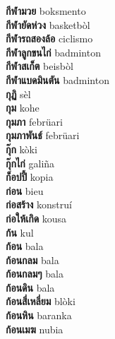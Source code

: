\textbf{ กีฬามวย  } boksmento \\
\textbf{ กีฬายัดห่วง  } basketbòl \\
\textbf{ กีฬารถสองล้อ  } ciclismo \\
\textbf{ กีฬาลูกขนไก่  } badminton \\
\textbf{ กีฬาสเก็ต  } beisbòl \\
\textbf{ กีฬาแบดมินตัน  } badminton \\
\textbf{ กุฏิ  } sèl \\
\textbf{ กุม  } kohe \\
\textbf{ กุมภา  } febrüari \\
\textbf{ กุมภาพันธ์  } febrüari \\
\textbf{ กุ๊ก  } kòki \\
\textbf{ กุ๊กไก่  } galiña \\
\textbf{ ก็อปปี้  } kopia \\
\textbf{ ก่อน  } bieu \\
\textbf{ ก่อสร้าง  } konstruí \\
\textbf{ ก่อให้เกิด  } kousa \\
\textbf{ ก้น  } kul \\
\textbf{ ก้อน  } bala \\
\textbf{ ก้อนกลม  } bala \\
\textbf{ ก้อนกลมๆ  } bala \\
\textbf{ ก้อนดิน  } bala \\
\textbf{ ก้อนสี่เหลี่ยม  } blòki \\
\textbf{ ก้อนหิน  } baranka \\
\textbf{ ก้อนเมฆ  } nubia \\
